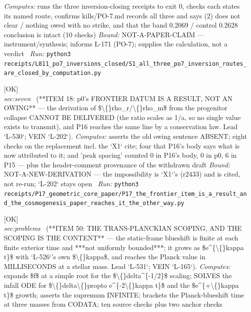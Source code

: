 \begin{description}
\emph{Computes:} runs the three inversion-closing receipts to exit 0, checks each states its named route, confirms kills/PO-7.md records all three and says (2) does not clear / nothing owed with no strike, and that the band 0.2069 / control 0.2628 conclusion is intact (10 checks)
 \emph{Bound:} NOT-A-PAPER-CLAIM --- instrument/synthesis; informs L-171 (PO-7); supplies the calculation, not a verdict
\ \emph{Run:} \texttt{python3 receipts/L811\_po7\_inversions\_closed/S1\_all\_three\_po7\_inversion\_routes\_are\_closed\_by\_computation.py}
\item[\label{rcpt:P17_the_frontier_item_is_a_result_and_the_cosmogenesis_paper_reaches_it_the_other_way}\texttt{P17\_the\_frontier\_item\_is\_a\_result\_and\_the\_cosmogenesis\_paper\_reaches\_it\_the\_other\_way}]\hfill\textsf{[OK]}\\
\textit{sec:seven} \ (**ITEM 18: p0's FRONTIER DATUM IS A RESULT, NOT AN OWING** --- the derivation of \$\textbackslash\{\}rho\_r/\textbackslash\{\}rho\_m\$ from the progenitor collapse CANNOT BE DELIVERED (the ratio scales as 1/a, so no single value exists to transmit), and P16 reaches the same line by a conservation law. Lead `L-530`; VEIN `L-202`). 
\emph{Computes:} asserts the old owing sentence ABSENT; eight checks on the replacement incl. the `X1` cite; four that P16's body says what is now attributed to it; and 'peak spacing' counted 0 in P16's body, 0 in p0, 6 in P15 --- plus the header-comment provenance of the withdrawn draft
 \emph{Bound:} NOT-A-NEW-DERIVATION --- the impossibility is `X1`'s (r2433) and is cited, not re-run; `L-202` stays open
\ \emph{Run:} \texttt{python3 receipts/P17\_geometric\_core\_paper/P17\_the\_frontier\_item\_is\_a\_result\_and\_the\_cosmogenesis\_paper\_reaches\_it\_the\_other\_way.py}
\item[\label{rcpt:P1_the_transplanckian_claim_is_finite_at_each_finite_time_and_it_is_not_bounded}\texttt{P1\_the\_transplanckian\_claim\_is\_finite\_at\_each\_finite\_time\_and\_it\_is\_not\_bounded}]\hfill\textsf{[OK]}\\
\textit{sec:problems} \ (**ITEM 50: THE TRANS-PLANCKIAN SCOPING, AND THE SCOPING IS THE CONTENT** --- the static-frame blueshift is finite at each finite exterior time and ***not uniformly bounded***; it grows as \$e\textasciicircum{}\{\textbackslash\{\}kappa t\}\$ with `L-526`'s own \$\textbackslash\{\}kappa\$, and reaches the Planck value in MILLISECONDS at a stellar mass. Lead `L-531`; VEIN `L-165`). 
\emph{Computes:} expands \$f\$ at a simple root for the \$\textbackslash\{\}delta\textasciicircum{}\{-1/2\}\$ scaling; SOLVES the infall ODE for \$\textbackslash\{\}delta\textbackslash\{\}propto e\textasciicircum{}\{-2\textbackslash\{\}kappa t\}\$ and the \$e\textasciicircum{}\{+\textbackslash\{\}kappa t\}\$ growth; asserts the supremum INFINITE; brackets the Planck-blueshift time at three masses from CODATA; ten source checks plus two anchor checks

\end{description}
